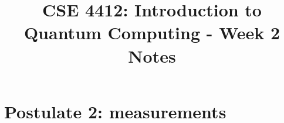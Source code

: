 \documentclass[11pt]{article}
\title{CSE 4412: Introduction to Quantum Computing - Week 2 Notes}
\author{}
\date{}
\begin{document}
\maketitle
\section*{Postulate 2: measurements}
\end{document}
